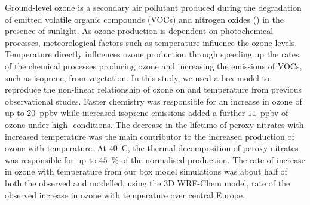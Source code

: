 Ground-level ozone is a secondary air pollutant produced during the degradation of emitted volatile organic compounds (VOCs) and nitrogen oxides () in the presence of sunlight. 
As ozone production is dependent on photochemical processes, meteorological factors such as temperature influence the ozone levels.
Temperature directly influences ozone production through speeding up the rates of the chemical processes producing ozone and increasing the emissions of VOCs, such as isoprene, from vegetation.
In this study, we used a box model to reproduce the non-linear relationship of ozone on  and temperature from previous observational studes.
Faster chemistry was responsible for an increase in ozone of up to $20$~ppbv while increased isoprene emissions added a further $11$~ppbv of ozone under high- conditions.
The decrease in the lifetime of peroxy nitrates with increased temperature was the main contributor to the increased production of ozone with temperature. 
At $40$~\degree C, the thermal decomposition of peroxy nitrates was responsible for up to $45$~\% of the normalised  production.
The rate of increase in ozone with temperature from our box model simulations was about half of both the observed and modelled, using the 3D WRF-Chem model, rate of the observed increase in ozone with temperature over central Europe.
